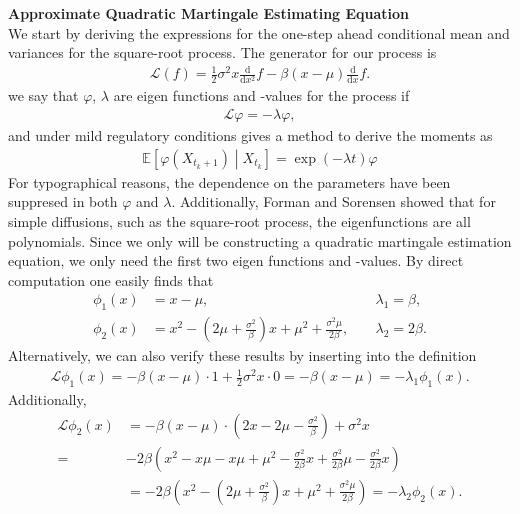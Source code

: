 \noindent \textbf{Approximate Quadratic Martingale Estimating Equation}\\
We start by deriving the expressions for the one-step ahead conditional mean and variances for the square-root process. The generator for our process is
\begin{align}
    \mathcal{L}(f) = \frac{1}{2}\sigma^2x\frac{\mathrm{d}}{\mathrm{d}x^2}f -\beta\left(x - \mu\right)\frac{\mathrm{d}}{\mathrm{d}x}f.
\end{align}
we say that $\varphi$, $\lambda$ are eigen functions and -values for the process if
\begin{align}
    \mathcal{L}\varphi = - \lambda \varphi,
\end{align}
and under mild regulatory conditions \cite[theorem 1.16]{StatisticalMethodsForSDE} gives a method to derive the moments as
\begin{align}
    \mathbb{E}\left[\varphi(X_{t_k + 1}) \middle | X_{t_k}\right] = \exp\left(-\lambda t\right)\varphi \label{eq:momentConditions}
\end{align}
For typographical reasons, the dependence on the parameters have been suppresed in both $\varphi$ and $\lambda$. Additionally, Forman and Sorensen \cite{FormanSorensen2008} showed that for simple diffusions, such as the square-root process, the eigenfunctions are all polynomials. Since we only will be constructing a quadratic martingale estimation equation, we only need the first two eigen functions and -values. By direct computation one easily finds that 
\begin{align}
    \phi_1(x) &= x-\mu, &&\; \lambda_1 = \beta, \label{squarerooteigen1}\\
    \phi_2(x) &= x^2 - \left(2\mu + \frac{\sigma^2}{\beta}\right)x + \mu^2 + \frac{\sigma^2\mu}{2\beta}, &&\; \lambda_2 = 2\beta. \label{squarerooteigen2}
\end{align}
Alternatively, we can also verify these results by inserting into the definition
\begin{align}
    \mathcal{L}\phi_1(x) = -\beta\left(x - \mu\right)\cdot 1 + \frac{1}{2}\sigma^2 x \cdot 0 = -\beta\left(x - \mu\right) = -\lambda_1\phi_1(x).
\end{align}
Additionally,
\begin{align}
    \mathcal{L}\phi_2(x) &= -\beta\left(x - \mu\right)\cdot \left(2x -2\mu - \frac{\sigma^2}{\beta}\right) + \sigma^2x\\
    =& -2\beta\left(x^2-x\mu - x\mu + \mu^2 -\frac{\sigma^2}{2\beta}x + \frac{\sigma^2}{2\beta}\mu - \frac{\sigma^2}{2\beta}x \right)\\
    &= -2\beta \left(x^2 -\left(2\mu+\frac{\sigma^2}{\beta}\right)x + \mu^2 + \frac{\sigma^2\mu}{2\beta}\right) = -\lambda_2\phi_2(x).\\
\end{align}
